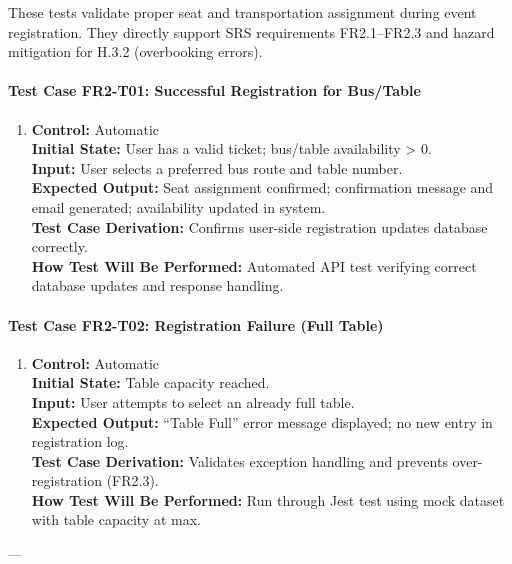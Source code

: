 \documentclass[12pt, titlepage]{article}
\begin{document}
These tests validate proper seat and transportation assignment during event registration. They directly support SRS requirements FR2.1–FR2.3 and hazard mitigation for H.3.2 (overbooking errors).

\paragraph{Test Case FR2-T01: Successful Registration for Bus/Table}

\begin{enumerate}
    \item \textbf{Control:} Automatic\\
    \textbf{Initial State:} User has a valid ticket; bus/table availability > 0.\\
    \textbf{Input:} User selects a preferred bus route and table number.\\
    \textbf{Expected Output:} Seat assignment confirmed; confirmation message and email generated; availability updated in system.\\
    \textbf{Test Case Derivation:} Confirms user-side registration updates database correctly.\\
    \textbf{How Test Will Be Performed:} Automated API test verifying correct database updates and response handling.
\end{enumerate}

\paragraph{Test Case FR2-T02: Registration Failure (Full Table)}

\begin{enumerate}
    \item \textbf{Control:} Automatic\\
    \textbf{Initial State:} Table capacity reached.\\
    \textbf{Input:} User attempts to select an already full table.\\
    \textbf{Expected Output:} “Table Full” error message displayed; no new entry in registration log.\\
    \textbf{Test Case Derivation:} Validates exception handling and prevents over-registration (FR2.3).\\
    \textbf{How Test Will Be Performed:} Run through Jest test using mock dataset with table capacity at max.
\end{enumerate}

---
\end{document}
